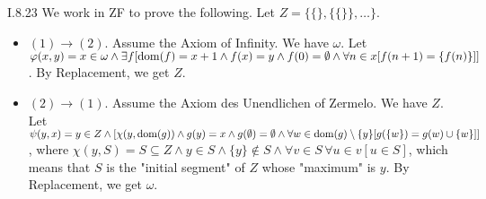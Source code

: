 \documentclass[12pt]{article}
\begin{document}
\begin{customthm}{I.8.23}
  We work in ZF to prove the following. Let $Z=\{\{\},\{\{\}\},\ldots\}$.
  \begin{itemize}
    \item\underline{$(1)\rightarrow(2)$}. Assume the Axiom of Infinity. We have $\omega$. Let $\varphi(x,y)=x\in\omega\wedge\exists f[\mathop{\mathrm{dom}}(f)=x+1\wedge f(x)=y\wedge f(0)=\emptyset\wedge\forall n\in x[f(n+1)=\{f(n)\}]]$. By Replacement, we get $Z$.
    \item\underline{$(2)\rightarrow(1)$}. Assume the Axiom des Unendlichen of Zermelo. We have $Z$. Let $\psi(y,x)=y\in Z\wedge[\chi(y,\mathop{\mathrm{dom}}(g))\wedge g(y)=x\wedge g(\emptyset)=\emptyset\wedge\forall w\in\mathop{\mathrm{dom}}(g)\setminus\{y\}[g(\{w\})=g(w)\cup\{w\}]]$, where $\chi(y, S)=S\subseteq Z\wedge y\in S\wedge\{y\}\not\in S\wedge\forall v\in S\,\forall u\in v[u\in S]$, which means that $S$ is the "initial segment" of $Z$ whose "maximum" is $y$. By Replacement, we get $\omega$.
  \end{itemize}
\end{customthm}
\end{document}
